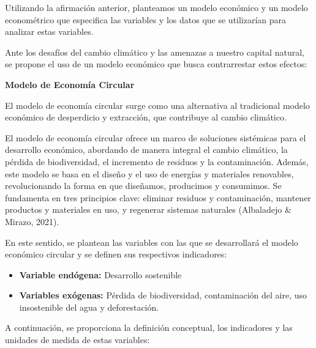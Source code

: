 \documentclass[
  a4paper,
]{article}
\providecommand{\tightlist}{%
  \setlength{\itemsep}{0pt}\setlength{\parskip}{0pt}}\usepackage{longtable,booktabs,array}
\begin{document}
Utilizando la afirmación anterior, planteamos un modelo económico y un
modelo econométrico que especifica las variables y los datos que se
utilizarían para analizar estas variables.

Ante los desafíos del cambio climático y las amenazas a nuestro capital
natural, se propone el uso de un modelo económico que busca
contrarrestar estos efectos:

\textbf{Modelo de Economía Circular}

El modelo de economía circular surge como una alternativa al tradicional
modelo económico de desperdicio y extracción, que contribuye al cambio
climático.

El modelo de economía circular ofrece un marco de soluciones sistémicas
para el desarrollo económico, abordando de manera integral el cambio
climático, la pérdida de biodiversidad, el incremento de residuos y la
contaminación. Además, este modelo se basa en el diseño y el uso de
energías y materiales renovables, revolucionando la forma en que
diseñamos, producimos y consumimos. Se fundamenta en tres principios
clave: eliminar residuos y contaminación, mantener productos y
materiales en uso, y regenerar sistemas naturales (Albaladejo \& Mirazo,
2021).

En este sentido, se plantean las variables con las que se desarrollará
el modelo económico circular y se definen sus respectivos indicadores:

\begin{itemize}
\tightlist
\item
  \textbf{Variable endógena:} Desarrollo sostenible
\item
  \textbf{Variables exógenas:} Pérdida de biodiversidad, contaminación
  del aire, uso insostenible del agua y deforestación.
\end{itemize}

A continuación, se proporciona la definición conceptual, los indicadores
y las unidades de medida de estas variables:
\end{document}
